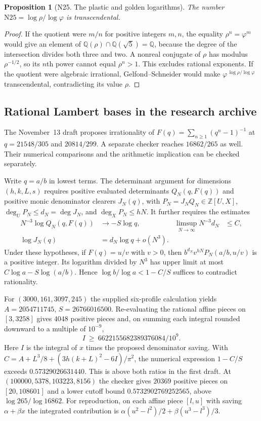 \documentclass[11pt,a4paper]{article}
\newtheorem{proposition}[theorem]{Proposition}
\theoremstyle{definition}
\theoremstyle{remark}
\begin{document}
\par\hypertarget{cat-N25}{}\label{page:N25}
\begin{proposition}[N25. The plastic and golden logarithms]
The number $\mathrm{N25}=\log\rho/\log\varphi$ is transcendental.
\end{proposition}
\begin{proof}
If the quotient were $m/n$ for positive integers $m,n$, the equality
$\rho^n=\varphi^m$ would give an element of
$\mathbb Q(\rho)\cap\mathbb Q(\sqrt5)=\mathbb Q$, because the degree
of the intersection divides both three and two. A nonreal conjugate
of $\rho$ has modulus $\rho^{-1/2}$, so its $n$th power cannot equal
$\rho^n>1$. This excludes rational exponents. If the quotient were
algebraic irrational, Gelfond--Schneider would make
$\varphi^{\,\log\rho/\log\varphi}$ transcendental, contradicting
its value $\rho$.
\end{proof}

\subsection{Rational Lambert bases in the research archive}
\label{sec:nlambertaudit}
The November~13 draft \cite{nLamDraft} proposes irrationality of
$F(q)=\sum_{n\ge1}(q^n-1)^{-1}$ at $q=21548/305$ and $20814/299$.
A separate checker \cite{nLamCode} reaches $16862/265$ as well.
Their numerical comparisons and the arithmetic implication can be
checked separately.

Write $q=a/b$ in lowest terms. The determinant argument for
dimensions $(h,k,L,s)$ requires positive evaluated
determinants $Q_N(q,F(q))$ and positive monic denominator clearers
$J_N(q)$, with $P_N=J_N Q_N\in\mathbb Z[U,X]$,
$\deg_U P_N\le d_N=\deg J_N$, and $\deg_X P_N\le hN$.
It further requires the estimates
\[
 \begin{aligned}
 N^{-3}\log Q_N(q,F(q))&\longrightarrow-S\log q,
 &\limsup_{N\to\infty}N^{-3}d_N&\le C,\\
 \log J_N(q)&=d_N\log q+o(N^3).
 \end{aligned}
\]
Under these hypotheses, if $F(q)=u/v$ with $v>0$, then
$b^{d_N}v^{hN}P_N(a/b,u/v)$ is a positive integer. Its logarithm
divided by $N^3$ has upper limit at most
$C\log a-S\log(a/b)$. Hence $\log b/\log a<1-C/S$ suffices to
contradict rationality.

For $(3000,161,3097,245)$ the supplied six-profile calculation yields
$A=2054711745$, $S=26766016500$. Re-evaluating the rational affine
pieces on $[3,3258]$ gives $4048$ positive pieces and, on summing
each integral rounded downward to a multiple of $10^{-9}$,
\[
 I\ \ge\ 6622155682389376084/10^9 .
\]
Here $I$ is the integral of $x$ times the proposed denominator saving.
With $C=A+L^3/8+(3h(k+L)^2-6I)/\pi^2$, the numerical expression
$1-C/S$ exceeds $0.57329026631440$. This is above both ratios in the
first draft. At $(100000,5378,103223,8156)$ the checker gives
$20369$ positive pieces on $[20,108601]$ and a lower cutoff bound
$0.5732902769252565$, above $\log265/\log16862$.
For reproduction, on each affine piece $[l,u]$ with saving
$\alpha+\beta x$ the integrated contribution is
$\alpha(u^2-l^2)/2+\beta(u^3-l^3)/3$.
\end{document}
